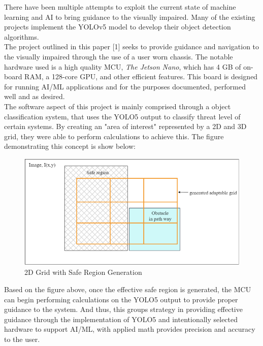 \noindent There have been multiple attempts to exploit the current state of machine learning and AI to bring guidance to the visually impaired. Many of the existing projects implement the YOLOv5 model to develop their object detection algorithms.\\

\noindent The project outlined in this paper [1] seeks to provide guidance and navigation to the visually impaired through the use of a user worn chassis. The notable hardware used is a high quality MCU, \textit{The Jetson Nano}, which has 4 GB of on-board RAM, a 128-core GPU, and other efficient features. This board is designed for running AI/ML applications and for the purposes documented, performed well and as desired. \\

\noindent The software aspect of this project is mainly comprised through a object classification system, that uses the YOLO5 output to classify threat level of certain systems. By creating an "area of interest" represented by a 2D and 3D grid, they were able to perform calculations to achieve this. The figure demonstrating this concept is show below:
				
\begin{figure}[H]
	\centering
	\includegraphics[width=\textwidth]{./Images/Figure1_Grid_Detection.png}
	\caption{\label{fig:Grid-Generatio}2D Grid with Safe Region Generation}
\end{figure}

\noindent Based on the figure above, once the effective safe region is generated, the MCU can begin performing calculations on the YOLO5 output to provide proper guidance to the system. And thus, this groups strategy in providing effective guidance through the implementation of YOLO5 and intentionally selected hardware to support AI/ML, with  applied math provides precision and accuracy to the user. \\

